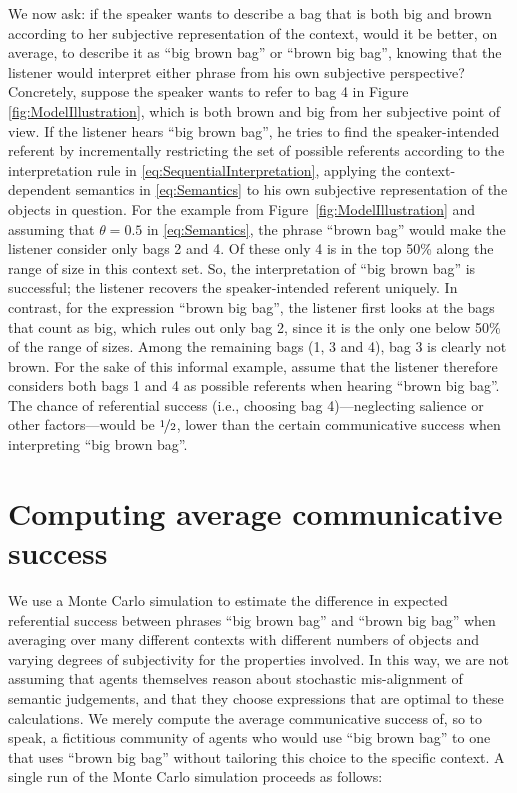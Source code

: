 \documentclass[10pt,a4paper]{article}
\begin{document}
We now ask: if the speaker wants to describe a bag that is both big and brown according to her subjective representation of the context, would it be better, on average, to describe it as ``big brown bag'' or ``brown big bag'', knowing that the listener would interpret either phrase from his own subjective perspective? Concretely, suppose the speaker wants to refer to bag 4 in Figure \ref{fig:ModelIllustration}, which is both brown and big from her subjective point of view. If the listener hears ``big brown bag'', he tries to find the speaker-intended referent by incrementally restricting the set of possible referents according to the interpretation rule in \eqref{eq:SequentialInterpretation}, applying the context-dependent semantics in \eqref{eq:Semantics} to his own subjective representation of the objects in question. For the example from Figure~\ref{fig:ModelIllustration} and assuming that $\theta = 0.5$ in \eqref{eq:Semantics}, the phrase ``brown bag'' would make the listener consider only bags 2 and 4. Of these only 4 is in the top 50\% along the range of size in this context set. So, the interpretation of ``big brown bag'' is successful; the listener recovers the speaker-intended referent uniquely. In contrast, for the expression ``brown big bag'', the listener first looks at the bags that count as big, which rules out only bag 2, since it is the only one below 50\% of the range of sizes. Among the remaining bags (1, 3 and 4), bag 3 is clearly not brown. For the sake of this informal example, assume that the listener therefore considers both bags 1 and 4 as possible referents when hearing ``brown big bag''. The chance of referential success (i.e., choosing bag 4)---neglecting salience or other factors---would be $\nicefrac{1}{2}$, lower than the certain communicative success when interpreting ``big brown bag''.


\section{Computing average communicative success}

We use a Monte Carlo simulation to estimate the difference in expected referential success between phrases ``big brown bag'' and ``brown big bag'' when averaging over many different contexts with different numbers of objects and varying degrees of subjectivity for the properties involved. In this way, we are not assuming that agents themselves reason about stochastic mis-alignment of semantic judgements, and that they choose expressions that are optimal to these calculations. We merely compute the average communicative success of, so to speak, a fictitious community of agents who would use ``big brown bag'' to one that uses ``brown big bag'' without tailoring this choice to the specific context. A single run of the Monte Carlo simulation proceeds as follows:
\end{document}
